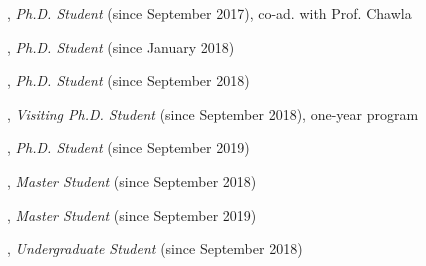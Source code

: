 \documentclass[10pt]{article}
\newenvironment{myindentpar}[1]%
{\begin{list}{}%
         {\setlength{\leftmargin}{#1}}%
         \item[]%
}
{\end{list}}
\newcounter{list}
\newcommand{\hide}[1]{}
\begin{document}
\begin{myindentpar}{0.75cm}

\hspace{-0.75cm}{\bf Daheng Wang}, \emph{Ph.D. Student} (since September 2017), co-ad. with Prof. Chawla

\hspace{-0.75cm}{\bf Qingkai Zeng}, \emph{Ph.D. Student} (since January 2018)

\hspace{-0.75cm}{\bf Tong Zhao}, \emph{Ph.D. Student} (since September 2018)

\hspace{-0.75cm}{\bf Tianwen Jiang}, \emph{Visiting Ph.D. Student} (since September 2018), one-year program

\hspace{-0.75cm}{\bf Wenhao Yu}, \emph{Ph.D. Student} (since September 2019)

\hspace{-0.75cm}{\bf Yifan Ding}, \emph{Master Student} (since September 2018)

\hspace{-0.75cm}{\bf Jiaming Li}, \emph{Master Student} (since September 2019)

\hspace{-0.75cm}{\bf Tina Wu}, \emph{Undergraduate Student} (since September 2018)

\end{myindentpar}

\hide{
\subsection{\sc Media Coverage}
\vspace{-0.4cm} \line(1,0){370} \vspace{-0.1cm}

\begin{myindentpar}{0.75cm}
{\em With modern media, press coverage sometimes spreads far and wide. There are often more outlets reporting than can be captured. This section therefore lists only a representative article (or two) of the total press coverage.}

\hspace{-0.75cm} XXX (XXX 2019) 
\hspace{0.75cm}{\em XXX}

\hspace{-0.75cm} XXX (XXX 2019) 

\url{https://www.XXX.com/}

\end{myindentpar}
}
\end{document}
